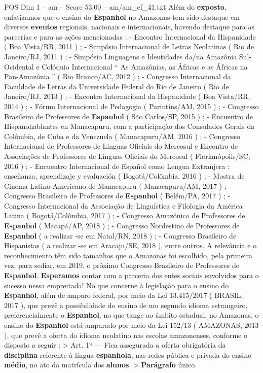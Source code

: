 \begin{textsample}{POS Dim 1 – am – Score 53.00 – am/am\_ef\_41.txt}
Além do \textbf{exposto}, enfatizamos que o ensino do \textbf{Espanhol} no Amazonas tem sido destaque em diversos \textbf{eventos} regionais, nacionais e internacionais, havendo destaque para as parcerias e para as ações mencionadas : - Encontro Internacional da Hispanidade ( Boa Vista/RR, 2011 ) ; - Simpósio Internacional de Letras Neolatinas ( Rio de Janeiro/RJ, 2011 ) ; - Simpósio Linguagens e Identidades da/na Amazônia Sul-Ocidental e Colóquio Internacional “ As Amazônias, as Áfricas e as Áfricas na Pan-Amazônia ” ( Rio Branco/AC, 2012 ) ; - Congresso Internacional da Faculdade de Letras da Universidade Federal do Rio de Janeiro ( Rio de Janeiro/RJ, 2013 ) ; - Encontro Internacional da Hispanidade ( Boa Vista/RR, 2014 ) ; - Fórum Internacional de Pedagogia ( Parintins/AM, 2015 ) ; - Congresso Brasileiro de Professores de \textbf{Espanhol} ( São Carlos/SP, 2015 ) ; - Encuentro de Hispanohablantes en Manacapuru, com a participação dos Consulados Gerais da Colômbia, de Cuba e da Venezuela ( Manacapuru/AM, 2016 ) ; - Congresso Internacional de Professores de Línguas Oficiais do Mercosul e Encontro de Associações de Professores de Línguas Oficiais do Mercosul ( Florianópolis/SC, 2016 ) ; - Encuentro Internacional de Español como Lengua Extranjera : enseñanza, aprendizaje y evaluación ( Bogotá/Colômbia, 2016 ) ; - Mostra de Cinema Latino-Americano de Manacapuru ( Manacapuru/AM, 2017 ) ; - Congresso Brasileiro de Professores de \textbf{Espanhol} ( Belém/PA, 2017 ) ; - Congresso Internacional da Associação de Linguística e Filologia da América Latina ( Bogotá/Colômbia, 2017 ) ; - Congresso Amazônico de Professores de \textbf{Espanhol} ( Macapá/AP, 2018 ) ; - Congresso Nordestino de Professores de \textbf{Espanhol} ( a realizar -se em Natal/RN, 2018 ) ; - Congresso Brasileiro de Hispanistas ( a realizar -se em Aracaju/SE, 2018 ), entre outros.
A relevância e o reconhecimento têm sido tamanhos que o Amazonas foi escolhido, pela primeira vez, para sediar, em 2019, o próximo Congresso Brasileiro de Professores de \textbf{Espanhol}. \textbf{Esperamos} contar com a parceria dos entes sociais envolvidos para o sucesso nessa empreitada!
No que concerne à legislação para o ensino do \textbf{Espanhol}, além de amparo federal, por meio da Lei 13.415/2017 ( BRASIL, 2017 ), que prevê a possibilidade do ensino de um segundo idioma estrangeiro, preferencialmente o \textbf{Espanhol}, no que tange ao âmbito estadual, no Amazonas, o ensino do \textbf{Espanhol} está amparado por meio da Lei 152/13 ( AMAZONAS, 2013 ), que prevê a oferta do idioma neolatino nas escolas amazonenses, conforme o disposto a seguir : > Art. 1º — Fica assegurada a oferta obrigatória da \textbf{disciplina} referente à língua \textbf{espanhola}, nas redes pública e privada do ensino \textbf{médio}, no ato da matrícula dos \textbf{alunos}. > \textbf{Parágrafo} único.

\end{textsample}
